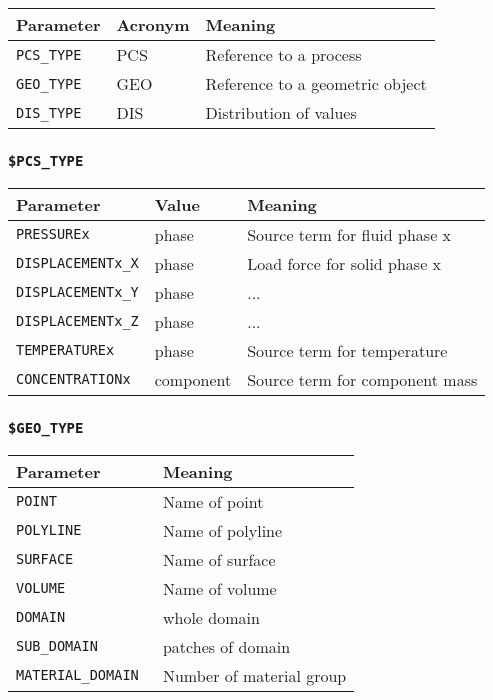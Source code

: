 \begin{tabular*}{12.773cm}{|p{}|p{1.5cm}|p{7cm}|} \hline
Parameter          & Acronym & Meaning \\ \hline \hline
%
\texttt{PCS\_TYPE} & PCS &  Reference to a process \\
\texttt{GEO\_TYPE} & GEO &  Reference to a geometric object \\
\texttt{DIS\_TYPE} & DIS &  Distribution of values \\
\hline
\end{tabular*}

\subsubsection{\texttt{\$PCS\_TYPE}}

\begin{tabular*}{12.773cm}{|p{}|p{1.5cm}|p{7cm}|} \hline
Parameter          & Value & Meaning \\ \hline \hline
%
\texttt{PRESSUREx}        & phase & Source term for fluid phase x \\
\texttt{DISPLACEMENTx\_X} & phase & Load force for solid phase x \\
\texttt{DISPLACEMENTx\_Y} & phase & ... \\
\texttt{DISPLACEMENTx\_Z} & phase & ... \\
\texttt{TEMPERATUREx}     & phase & Source term for temperature \\
\texttt{CONCENTRATIONx}   & component & Source term for component mass \\
\hline
\end{tabular*}

\subsubsection{\texttt{\$GEO\_TYPE}}

\begin{tabular*}{12.773cm}{|p{}|p{8.9cm}|} \hline
Parameter          & Meaning \\ \hline \hline
%
\texttt{POINT}     & Name of point \\
\texttt{POLYLINE}  & Name of polyline \\
\texttt{SURFACE}   & Name of surface \\
\texttt{VOLUME }   & Name of volume \\
\texttt{DOMAIN }   & whole domain \\
\texttt{SUB\_DOMAIN }  & patches of domain \\
\texttt{MATERIAL\_DOMAIN }  & Number of material group \\
\hline
\end{tabular*}

